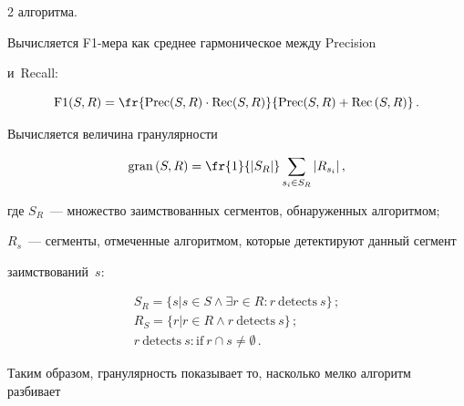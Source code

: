 \begin{multicols}{2}
алгоритма.



Вычисляется {F1-мера} как среднее гармоническое между {Precision} 

и~{Recall}:

$$

\mathrm{F}1(S,R) = \fr{\text{Prec} (S, R) \cdot \text{Rec} (S, R)}{\text{Prec} (S, R) + 

\mathrm{Rec}\, (S, R)}\,.

$$

Вычисляется величина гранулярности



\vspace*{2pt}



\noindent

$$

\mathrm{gran}\,(S,R)=\fr{1}{|S_R|}\sum\limits_{s_i\in S_R}|R_{s_i}|\,,

$$

где $S_R$~--- множество заимствованных сегментов, обнаруженных алгоритмом; 

$R_s$~--- сегменты, отмеченные алгоритмом, которые детектируют данный сегмент 

заимствований~$s$:



\vspace*{-2pt}



\noindent

\begin{gather*}

S_R = \lbrace s | s \in S \wedge \exists r \in R: r\ \mathrm{detects}\ s \rbrace\,;

\\

R_S = \lbrace r | r \in R  \wedge r\ \mathrm{detects}\ s\rbrace\,;

\\

r\ \mathrm{detects}\ s: \mathrm{if}\ r\cap s \neq \emptyset\,.

\end{gather*}



\vspace*{-2pt}



\noindent

Таким образом, гранулярность показывает то, насколько мелко алгоритм разбивает 


\end{multicols}
